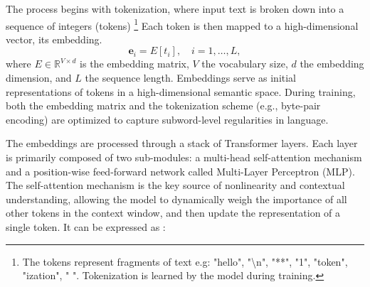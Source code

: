 \documentclass[a4paper,12pt]{article}
\begin{document}
The process begins with tokenization, where input text is broken down into a sequence of integers (tokens) \footnote{The tokens represent fragments of text e.g: "hello", "\textbackslash n", "**", "1", "token", "ization", " ". Tokenization is learned by the model during training.} Each token is then mapped to a high-dimensional vector, its embedding.
\begin{equation}
    \mathbf{e}_i = E[t_i], \quad i = 1, \dots, L,
\end{equation}
where $E \in \mathbb{R}^{V \times d}$ is the embedding matrix, $V$ the vocabulary size, $d$ the embedding dimension, and $L$ the sequence length. Embeddings serve as initial representations of tokens in a high-dimensional semantic space. During training, both the embedding matrix and the tokenization scheme (e.g., byte-pair encoding) are optimized to capture subword-level regularities in language. 

The embeddings are processed through a stack of Transformer layers. Each layer is primarily composed of two sub-modules: a multi-head self-attention mechanism and a position-wise feed-forward network called Multi-Layer Perceptron (MLP). The self-attention mechanism is the key source of nonlinearity and contextual understanding, allowing the model to dynamically weigh the importance of all other tokens in the context window, and then update the representation of a single token. It can be expressed as \cite{attention}:
\end{document}
